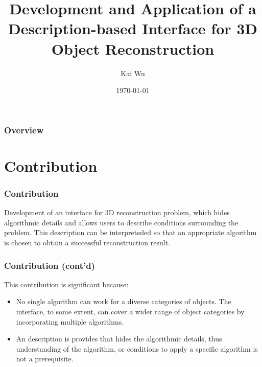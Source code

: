 \documentclass{beamer}
\title[Interface of 3D Reconstruction]{Development and Application of a Description-based Interface for 3D Object Reconstruction} %
\author{Kai Wu} %
\institute[UBC] %
{
University of British Columbia \\ %
\medskip
\textit{kaywu@ece.ubc.ca} \\ %
}
\date{\today} %
\begin{document}
\begin{frame}
\titlepage %
\end{frame}

\begin{frame}
\frametitle{Overview} %
\tableofcontents %
\end{frame}

\section{Contribution} %


\begin{frame}
\frametitle{Contribution}
Development of an interface for 3D reconstruction problem, which hides algorithmic details and allows users to describe conditions surrounding the problem. This description can be interpreteded so that an appropriate algorithm is chosen to obtain a successful reconstruction result.
\end{frame}

\begin{frame}
\frametitle{Contribution (cont'd)}
This contribution is significant because:
\begin{itemize}
\item No single algorithm can work for a diverse categories of objects. The interface, to some extent, can cover a wider range of object categories by incorporating multiple algorithms.
\item An description is provides that hides the algorithmic details, thus understanding of the algorithm, or conditions to apply a specific algorithm is not a prerequisite.
\end{itemize}
\end{frame}
\end{document}
